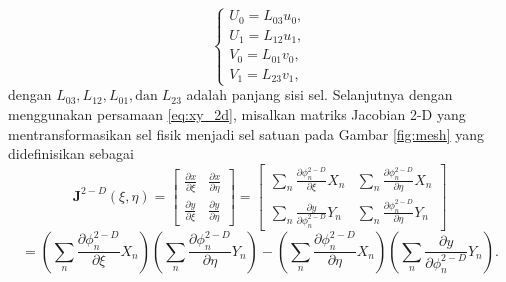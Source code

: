 \begin{spacing}{1.5}
	\begin{equation}\label{eq:linearflux}
		\begin{cases}
			U_0	= L_{03} u_0, \\
			U_1	= L_{12} u_1, \\
			V_0	= L_{01} v_0, \\
			V_1	= L_{23} v_1, 
		\end{cases}
	\end{equation}
	dengan $L_{03},L_{12},L_{01},\text{dan}\;L_{23}$ adalah panjang sisi sel. Selanjutnya dengan menggunakan persamaan \ref{eq:xy_2d}, misalkan matriks Jacobian 2-D yang mentransformasikan sel fisik menjadi sel satuan pada Gambar \ref{fig:mesh} yang didefinisikan sebagai
	\begin{equation*}
		\textbf{J}^{2-D}(\xi,\eta)=
		\begin{bmatrix}
			\frac{\partial x}{\partial \xi} & \frac{\partial x}{\partial \eta}\\
			\frac{\partial y}{\partial \xi} & \frac{\partial y}{\partial \eta}
		\end{bmatrix}
		=
		\begin{bmatrix}
			\sum_n\frac{\partial \phi_n^{2-D}}{\partial \xi}X_n & \sum_n\frac{\partial \phi_n^{2-D}}{\partial \eta}X_n\\
			\sum_n\frac{\partial y}{\partial \phi_n^{2-D}}Y_n & \sum_n\frac{\partial \phi_n^{2-D}}{\partial \eta}Y_n 
		\end{bmatrix}
	\end{equation*}
	\begin{equation}\label{eq:jacob_2d}
		= \left(\sum_n\frac{\partial \phi_n^{2-D}}{\partial \xi}X_n\right)\left(\sum_n\frac{\partial \phi_n^{2-D}}{\partial \eta}Y_n\right)-\left(\sum_n\frac{\partial \phi_n^{2-D}}{\partial \eta}X_n\right) \left(\sum_n\frac{\partial y}{\partial \phi_n^{2-D}}Y_n \right).
	\end{equation}


\end{spacing}
